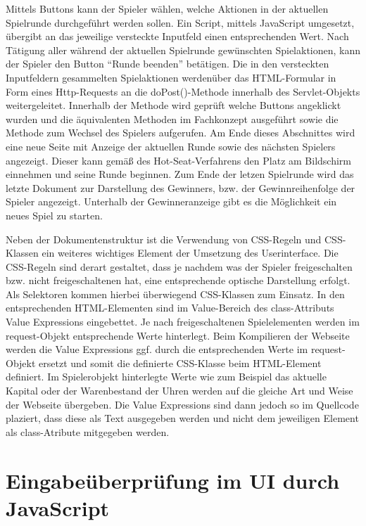 Mittels Buttons kann der Spieler wählen, welche Aktionen in der aktuellen Spielrunde durchgeführt werden sollen. Ein Script, mittels JavaScript umgesetzt, übergibt an das jeweilige versteckte Inputfeld einen entsprechenden Wert.
Nach Tätigung aller während der aktuellen Spielrunde gewünschten Spielaktionen, kann der Spieler den Button \enquote{Runde beenden} betätigen. Die in den versteckten Inputfeldern gesammelten Spielaktionen werdenüber das HTML-Formular in Form eines Http-Requests an die doPost()-Methode innerhalb des Servlet-Objekts weitergeleitet. Innerhalb der Methode wird geprüft welche Buttons angeklickt wurden und die äquivalenten Methoden im Fachkonzept ausgeführt sowie die Methode zum Wechsel des Spielers aufgerufen. Am Ende dieses Abschnittes wird eine neue Seite mit Anzeige der aktuellen Runde sowie des nächsten Spielers angezeigt. Dieser kann gemäß des Hot-Seat-Verfahrens den Platz am Bildschirm einnehmen und seine Runde beginnen. Zum Ende der letzen Spielrunde wird das letzte Dokument zur Darstellung des Gewinners, bzw. der Gewinnreihenfolge der Spieler angezeigt. Unterhalb der Gewinneranzeige gibt es die Möglichkeit ein neues Spiel zu starten.

Neben der Dokumentenstruktur ist die Verwendung von CSS-Regeln und CSS-Klassen ein weiteres wichtiges Element der Umsetzung des Userinterface. Die CSS-Regeln sind derart gestaltet, dass je nachdem was der Spieler freigeschalten bzw. nicht freigeschaltenen hat, eine entsprechende optische Darstellung erfolgt. Als Selektoren kommen hierbei überwiegend CSS-Klassen zum Einsatz. In den entsprechenden HTML-Elementen sind im Value-Bereich des class-Attributs Value Expressions eingebettet. Je nach freigeschaltenen Spielelementen werden im request-Objekt entsprechende Werte hinterlegt. Beim Kompilieren der Webseite werden die Value Expressions ggf. durch die entsprechenden Werte im request-Objekt ersetzt und somit die definierte CSS-Klasse beim HTML-Element definiert. Im Spielerobjekt hinterlegte Werte wie zum Beispiel das aktuelle Kapital oder der Warenbestand der Uhren werden auf die gleiche Art und Weise der Webseite übergeben. Die Value Expressions sind dann jedoch so im Quellcode plaziert, dass diese als Text ausgegeben werden und nicht dem jeweiligen Element als class-Atribute mitgegeben werden.



\section{Eingabeüberprüfung im UI durch JavaScript}

